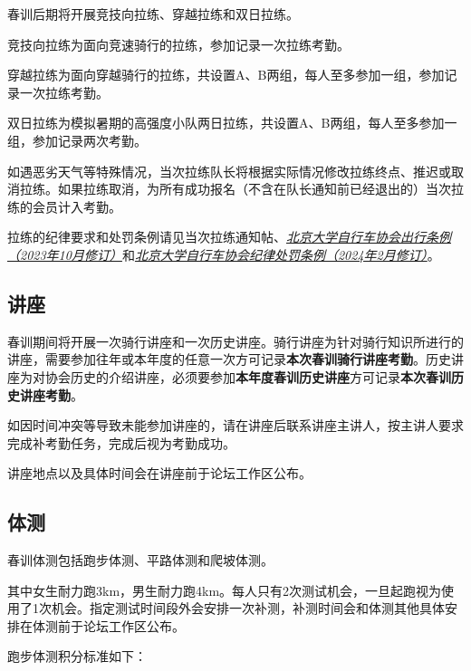 \documentclass[UTF8]{ctexart}
\begin{document}
春训后期将开展竞技向拉练、穿越拉练和双日拉练。

竞技向拉练为面向竞速骑行的拉练，参加记录一次拉练考勤。

穿越拉练为面向穿越骑行的拉练，共设置A、B两组，每人至多参加一组，参加记录一次拉练考勤。

双日拉练为模拟暑期的高强度小队两日拉练，共设置A、B两组，每人至多参加一组，参加记录两次考勤。



如遇恶劣天气等特殊情况，当次拉练队长将根据实际情况修改拉练终点、推迟或取消拉练。如果拉练取消，为所有成功报名（不含在队长通知前已经退出的）当次拉练的会员计入考勤。

拉练的纪律要求和处罚条例请见当次拉练通知帖、\href{https://chexie.net/bbs/content/?bid=1&tid=9618&p=1}{\textit{北京大学自行车协会出行条例（2023年10月修订）}}和\href{https://chexie.net/bbs/content/?bid=1&tid=9751&p=1}{\textit{北京大学自行车协会纪律处罚条例（2024年2月修订）}}。

\subsection{讲座}


春训期间将开展一次骑行讲座和一次历史讲座。骑行讲座为针对骑行知识所进行的讲座，需要参加往年或本年度的任意一次方可记录\textbf{本次春训骑行讲座考勤}。历史讲座为对协会历史的介绍讲座，必须要参加\textbf{本年度春训历史讲座}方可记录\textbf{本次春训历史讲座考勤}。

如因时间冲突等导致未能参加讲座的，请在讲座后联系讲座主讲人，按主讲人要求完成补考勤任务，完成后视为考勤成功。

讲座地点以及具体时间会在讲座前于论坛工作区公布。

\subsection{体测}

春训体测包括跑步体测、平路体测和爬坡体测。



其中女生耐力跑3km，男生耐力跑4km。每人只有2次测试机会，一旦起跑视为使用了1次机会。指定测试时间段外会安排一次补测，补测时间会和体测其他具体安排在体测前于论坛工作区公布。

跑步体测积分标准如下：
\end{document}
